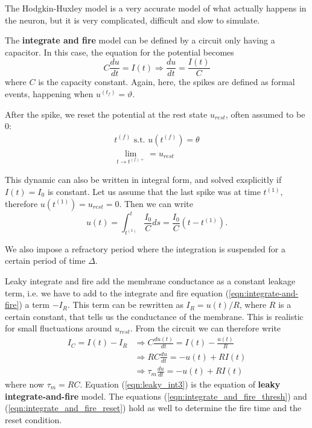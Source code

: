 \documentclass[oneside]{book}
\theoremstyle{definition}
\theoremstyle{plain}
\begin{document}
The Hodgkin-Huxley model is a very accurate model of what actually happens in the neuron, but it is very complicated, difficult and slow to simulate. 

The \textbf{integrate and fire} model can be defined by a circuit only having a capacitor. In this case, the equation for the potential becomes 
\begin{equation}\label{eqn:integrate-and-fire}
C\frac{du}{dt} =I(t) \Rightarrow \frac{du}{dt}=\frac{I(t)}{C}
\end{equation}
where $C$ is the capacity constant.
Again, here, the spikes are defined as formal events, happening when $u^{(t_f)} =\vartheta$.

After the spike, we reset the potential at the rest state $u_{rest}$, often assumed to be 0:
\begin{align}
\label{eqn:integrate_and_fire_thresh}
    t^{(f)} \text{ s.t. } u(t^{(f)})=\theta\\
\label{eqn:integrate_and_fire_reset}
    \lim_{t\to {t^{(f) +}}} =u_{rest}
\end{align}

This dynamic can also be written in integral form,  and solved exsplicitly  if $I(t)=I_0$ is constant. Let us assume that the last spike was at time $t^{(1)}$, therefore $u(t^{(1)})=u_{rest}=0$. Then we can write
\begin{equation}\label{eqn:integrate_and_fire_integral_form}
    u(t) =\int_{t^{(1)}}^{t} \frac{I_0}{C} ds = \frac{I_0}{C}(t-t^{(1)}).
\end{equation}

We also impose a refractory period where the integration is suspended for a certain period of time $\Delta$. 

Leaky integrate and fire add the membrane conductance as a constant leakage term, i.e. we have to add to the integrate and fire equation (\ref{eqn:integrate-and-fire}) a term $-I_R$. This term can be rewritten as $I_R=u(t)/R$, where $R$ is a certain constant, that tells us the conductance of the membrane. This is realistic for small fluctuations around $u_{rest}$. From the circuit we can therefore write
\begin{align}
    \label{eqn:leaky_int}
    I_C=I(t)-I_R &\Rightarrow C\frac{du(t)}{dt} = I(t)- \frac{u(t)}{R} \\
    \label{eqn:leaky_int2}
    &\Rightarrow RC\frac{du}{dt} = -u(t) + RI(t) \\
    \label{eqn:leaky_int3}
    &\Rightarrow \tau_m \frac{du}{dt} = -u(t) + RI(t)
\end{align}
where now $\tau_m=RC$. 
Equation (\ref{eqn:leaky_int3}) is the equation of \textbf{leaky integrate-and-fire }model. The equations (\ref{eqn:integrate_and_fire_thresh}) and (\ref{eqn:integrate_and_fire_reset}) hold as well to determine the fire time and the reset condition.
\end{document}
